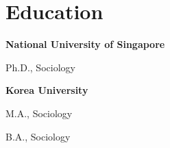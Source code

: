 \section{Education}

\begin{aka}[noitemsep]
    \item [] \textbf{National University of Singapore}
    \item [2020] Ph.D., Sociology
\end{aka}

\begin{aka}[noitemsep]
    \item [] \textbf{Korea University}
    \item [2014] M.A., Sociology
    \item [2009] B.A., Sociology
\end{aka}








